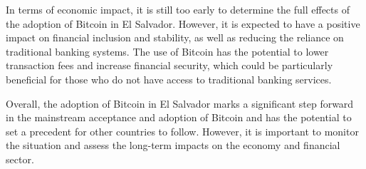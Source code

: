 In terms of economic impact, it is still too early to determine the full effects of the adoption of Bitcoin in El Salvador. However, it is expected to have a positive impact on financial inclusion and stability, as well as reducing the reliance on traditional banking systems. The use of Bitcoin has the potential to lower transaction fees and increase financial security, which could be particularly beneficial for those who do not have access to traditional banking services.\par
Overall, the adoption of Bitcoin in El Salvador marks a significant step forward in the mainstream acceptance and adoption of Bitcoin and has the potential to set a precedent for other countries to follow. However, it is important to monitor the situation and assess the long-term impacts on the economy and financial sector.
